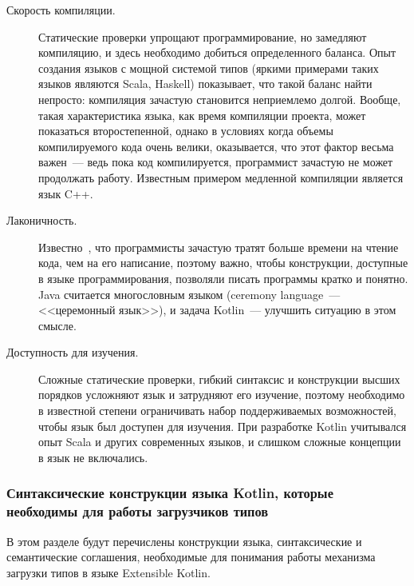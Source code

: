 \begin{description}
	\item[Скорость компиляции.] Статические проверки упрощают программирование, но замедляют компиляцию, и здесь необходимо добиться определенного баланса. Опыт создания языков с мощной системой типов (яркими примерами таких языков являются Scala, Haskell) показывает, что такой баланс найти непросто: компиляция зачастую становится неприемлемо долгой.
	Вообще, такая характеристика языка, как время компиляции проекта, может показаться второстепенной, однако в условиях когда объемы компилируемого кода очень велики, оказывается, что этот фактор весьма важен~--- ведь пока код компилируется, программист зачастую не может продолжать работу. Известным примером медленной компиляции является язык C++.

	\item[Лаконичность.] Известно~\cite{codecomplete}, что программисты зачастую тратят больше времени на чтение кода, чем на его написание, поэтому важно, чтобы конструкции, доступные в языке программирования, позволяли писать программы кратко и понятно.
	Java считается многословным языком (ceremony language~--- <<церемонный язык>>), и задача Kotlin~--- улучшить ситуацию в этом смысле.

	\item[Доступность для изучения.] Сложные статические проверки, гибкий синтаксис и конструкции высших порядков усложняют язык и затрудняют его изучение, поэтому необходимо в известной степени ограничивать набор поддерживаемых возможностей, чтобы язык был доступен для изучения. При разработке Kotlin учитывался опыт Scala и других современных языков, и слишком сложные концепции в язык не включались.
\end{description}

\subsubsection{Синтаксические конструкции языка Kotlin, которые необходимы для работы загрузчиков типов}

В этом разделе будут перечислены конструкции языка, синтаксические и семантические соглашения, необходимые для понимания работы механизма загрузки типов в языке Extensible Kotlin. 

